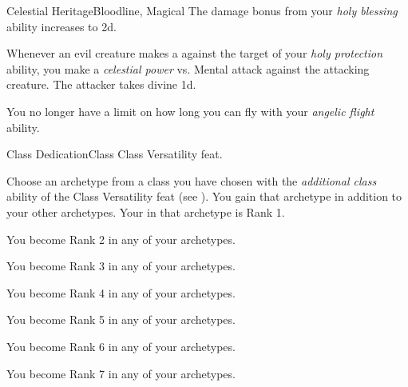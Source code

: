 \begin{feat}{Celestial Heritage}{Bloodline, Magical}
         The damage bonus from your \textit{holy blessing} ability increases to \plus2d.

         Whenever an evil creature makes a  against the target of your \textit{holy protection} ability, you make a \textit{celestial power} vs. Mental attack against the attacking creature.
        \hit The attacker takes divine  \minus1d.

         You no longer have a limit on how long you can fly with your \textit{angelic flight} ability.
    \end{feat}

    \begin{feat}{Class Dedication}{Class}
        \featpre Class Versatility feat.

         Choose an archetype from a class you have chosen with the \textit{additional class} ability of the Class Versatility feat (see ).
        You gain that archetype in addition to your other archetypes.
        Your  in that archetype is Rank 1.

         You become Rank 2 in any of your archetypes.

         You become Rank 3 in any of your archetypes.

         You become Rank 4 in any of your archetypes.

         You become Rank 5 in any of your archetypes.

         You become Rank 6 in any of your archetypes.

         You become Rank 7 in any of your archetypes.
    \end{feat}

